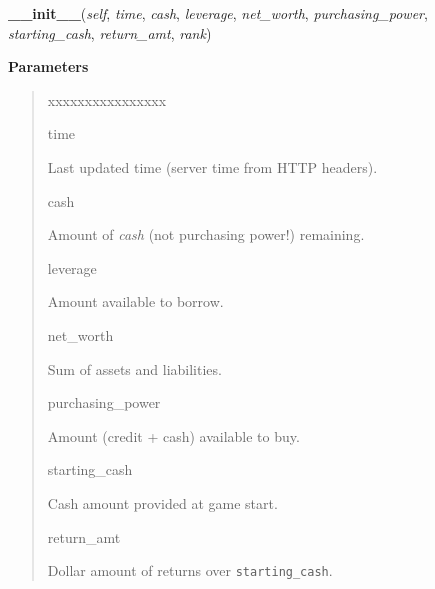 \hspace{.8\funcindent}\begin{boxedminipage}{\funcwidth}

    \raggedright \textbf{\_\_init\_\_}(\textit{self}, \textit{time}, \textit{cash}, \textit{leverage}, \textit{net\_worth}, \textit{purchasing\_power}, \textit{starting\_cash}, \textit{return\_amt}, \textit{rank})

\setlength{\parskip}{2ex}
\setlength{\parskip}{1ex}
      \textbf{Parameters}
      \vspace{-1ex}

      \begin{quote}
        \begin{Ventry}{xxxxxxxxxxxxxxxx}

          \item[time]

          Last updated time (server time from HTTP headers).

          \item[cash]

          Amount of \textit{cash} (not purchasing power!) remaining.

          \item[leverage]

          Amount available to borrow.

          \item[net\_worth]

          Sum of assets and liabilities.

          \item[purchasing\_power]

          Amount (credit + cash) available to buy.

          \item[starting\_cash]

          Cash amount provided at game start.

          \item[return\_amt]

          Dollar amount of returns over \texttt{starting\_cash}.

        \end{Ventry}

      \end{quote}

    \end{boxedminipage}


